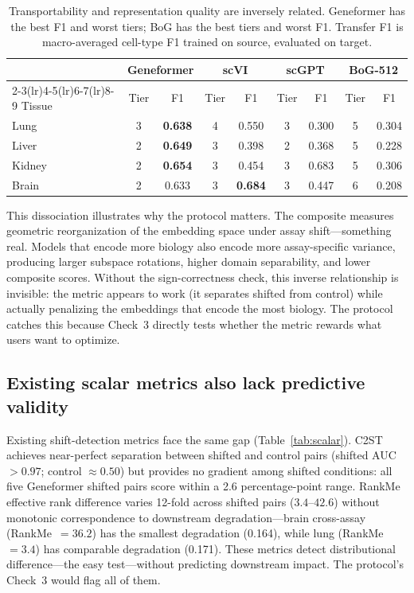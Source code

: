 \documentclass[10pt,letterpaper]{article}
\begin{document}
\begin{table}[t]
\centering
\caption{Transportability and representation quality are inversely related. Geneformer has the best F1 and worst tiers; BoG has the best tiers and worst F1. Transfer F1 is macro-averaged cell-type F1 trained on source, evaluated on target.}
\label{tab:dissociation}
\small
\begin{tabular}{@{}lcccccccc@{}}
\toprule
 & \multicolumn{2}{c}{Geneformer} & \multicolumn{2}{c}{scVI} & \multicolumn{2}{c}{scGPT} & \multicolumn{2}{c}{BoG-512} \\
\cmidrule(lr){2-3}\cmidrule(lr){4-5}\cmidrule(lr){6-7}\cmidrule(lr){8-9}
Tissue & Tier & F1 & Tier & F1 & Tier & F1 & Tier & F1 \\
\midrule
Lung   & 3 & \textbf{0.638} & 4 & 0.550 & 3 & 0.300 & 5 & 0.304 \\
Liver  & 2 & \textbf{0.649} & 3 & 0.398 & 2 & 0.368 & 5 & 0.228 \\
Kidney & 2 & \textbf{0.654} & 3 & 0.454 & 3 & 0.683 & 5 & 0.306 \\
Brain  & 2 & 0.633 & 3 & \textbf{0.684} & 3 & 0.447 & 6 & 0.208 \\
\bottomrule
\end{tabular}
\end{table}

This dissociation illustrates why the protocol matters. The composite measures geometric reorganization of the embedding space under assay shift---something real. Models that encode more biology also encode more assay-specific variance, producing larger subspace rotations, higher domain separability, and lower composite scores. Without the sign-correctness check, this inverse relationship is invisible: the metric appears to work (it separates shifted from control) while actually penalizing the embeddings that encode the most biology. The protocol catches this because Check~3 directly tests whether the metric rewards what users want to optimize.

\subsection{Existing scalar metrics also lack predictive validity}

Existing shift-detection metrics face the same gap (Table~\ref{tab:scalar}). C2ST achieves near-perfect separation between shifted and control pairs (shifted AUC $> 0.97$; control $\approx 0.50$) but provides no gradient among shifted conditions: all five Geneformer shifted pairs score within a 2.6 percentage-point range. RankMe effective rank difference varies 12-fold across shifted pairs ($3.4$--$42.6$) without monotonic correspondence to downstream degradation---brain cross-assay (RankMe~$= 36.2$) has the smallest degradation (0.164), while lung (RankMe~$= 3.4$) has comparable degradation (0.171). These metrics detect distributional difference---the easy test---without predicting downstream impact. The protocol's Check~3 would flag all of them.
\end{document}
